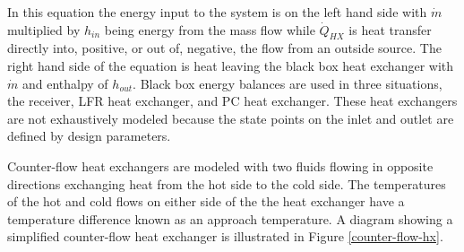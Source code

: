 In this equation the energy input to the system is on the left hand side with $\dot{m}$ multiplied by $h_{in}$ being energy from the mass flow while $\dot{Q}_{HX}$ is heat transfer directly into, positive, or out of, negative, the flow from an outside source. The right hand side of the equation is heat leaving the black box heat exchanger with $\dot{m}$ and enthalpy of $h_{out}$. Black box energy balances are used in three situations, the receiver, LFR heat exchanger, and PC heat exchanger. These heat exchangers are not exhaustively modeled because the state points on the inlet and outlet are defined by design parameters.

Counter-flow heat exchangers are modeled with two fluids flowing in opposite directions exchanging heat from the hot side to the cold side. The temperatures of the hot and cold flows on either side of the the heat exchanger have a temperature difference known as an approach temperature. A diagram showing a simplified counter-flow heat exchanger is illustrated in Figure \ref{counter-flow-hx}.

